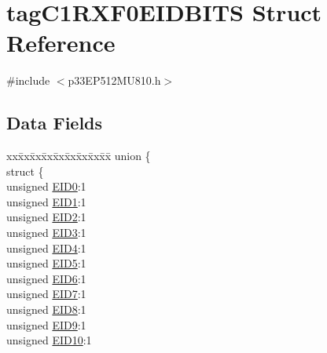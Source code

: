 \hypertarget{structtag_c1_r_x_f0_e_i_d_b_i_t_s}{}\section{tag\+C1\+R\+X\+F0\+E\+I\+D\+B\+I\+TS Struct Reference}
\label{structtag_c1_r_x_f0_e_i_d_b_i_t_s}


{\ttfamily \#include $<$p33\+E\+P512\+M\+U810.\+h$>$}

\subsection*{Data Fields}
\begin{DoxyCompactItemize}
\item 
\begin{tabbing}
xx\=xx\=xx\=xx\=xx\=xx\=xx\=xx\=xx\=\kill
union \{\\
\>struct \{\\
\>\>unsigned \hyperlink{structtag_c1_r_x_f0_e_i_d_b_i_t_s_a9da8b7b30247e4f9cd8cc056549aa9fd}{EID0}:1\\
\>\>unsigned \hyperlink{structtag_c1_r_x_f0_e_i_d_b_i_t_s_afd6c139491d147c1262f3d051c6691e9}{EID1}:1\\
\>\>unsigned \hyperlink{structtag_c1_r_x_f0_e_i_d_b_i_t_s_a36ec62d8d3c5acd5d15e6691dc099a94}{EID2}:1\\
\>\>unsigned \hyperlink{structtag_c1_r_x_f0_e_i_d_b_i_t_s_ab895f7d0ac289a0383b607cbc62eebe2}{EID3}:1\\
\>\>unsigned \hyperlink{structtag_c1_r_x_f0_e_i_d_b_i_t_s_a136d5a709d6618d40acceccb43036656}{EID4}:1\\
\>\>unsigned \hyperlink{structtag_c1_r_x_f0_e_i_d_b_i_t_s_a8dffb2d86a6c184df505ae7c71a58710}{EID5}:1\\
\>\>unsigned \hyperlink{structtag_c1_r_x_f0_e_i_d_b_i_t_s_af8a8574102515d8f1a4b7fd1685d0532}{EID6}:1\\
\>\>unsigned \hyperlink{structtag_c1_r_x_f0_e_i_d_b_i_t_s_a84c3262e67f8d5fd387ac10bde6fa9b1}{EID7}:1\\
\>\>unsigned \hyperlink{structtag_c1_r_x_f0_e_i_d_b_i_t_s_acca25e0b7d86eb499d01f85222baea87}{EID8}:1\\
\>\>unsigned \hyperlink{structtag_c1_r_x_f0_e_i_d_b_i_t_s_ac6748f73d4ada8538b06548be4f396c2}{EID9}:1\\
\>\>unsigned \hyperlink{structtag_c1_r_x_f0_e_i_d_b_i_t_s_a9cea8e77ecbb72bd3b08102412793725}{EID10}:1\\

\end{tabbing}
\end{DoxyCompactItemize}
